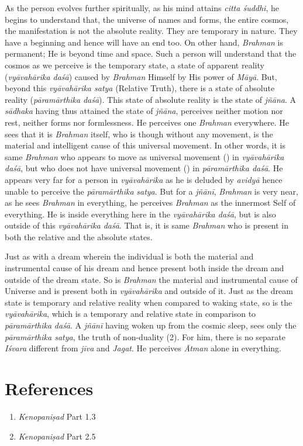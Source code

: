 As the person evolves further spiritually, as his mind attains \emph{citta śuddhi}, he begins to understand that, the universe of names and forms, the entire cosmos, the manifestation is not the absolute reality. They are temporary in nature. They have a beginning and hence will have an end too. On other hand, \emph{Brahman} is permanent; He is beyond time and space. Such a person will understand that the cosmos as we perceive is the temporary state, a state of apparent reality (\emph{vyāvahārika daśā}) caused by \emph{Brahman} Himself by His power of \emph{Māyā}. But, beyond this \emph{vyāvahārika satya} (Relative Truth), there is a state of absolute reality (\emph{pāramārthika} \emph{daśā}). This state of absolute reality is the state of \emph{jñāna}. A \emph{sādhaka} having thus attained the state of \emph{jñāna}, perceives neither motion nor rest, neither forms nor formlessness. He perceives one \emph{Brahman} everywhere. He sees that it is \emph{Brahman} itself, who is though without any movement, is the material and intelligent cause of this universal movement. In other words, it is same \emph{Brahman} who appears to move as universal movement () in \emph{vyāvahārika daśā}, but who does not have universal movement () in \emph{pāramārthika daśā}. He appears very far for a person in \emph{vyāvahārika} as he is deluded by \emph{avidyā} hence unable to perceive the \emph{pāramārthika} \emph{satya}. But for a \emph{jñānī}, \emph{Brahman} is very near, as he sees \emph{Brahman} in everything, he perceives \emph{Brahman} as the innermost Self of everything. He is inside everything here in the \emph{vyāvahārika daśā}, but is also outside of this \emph{vyāvahārika daśā}. That is, it is same \emph{Brahman} who is present in both the relative and the absolute states.

Just as with a dream wherein the individual is both the material and instrumental cause of his dream and hence present both inside the dream and outside of the dream state. So is \emph{Brahman} the material and instrumental cause of Universe and is present both in \emph{vyāvahārika} and outside of it. Just as the dream state is temporary and relative reality when compared to waking state, so is the \emph{vyāvahārika}, which is a temporary and relative state in comparison to \emph{pāramārthika} \emph{daśā}. A \emph{jñānī} having woken up from the cosmic sleep, sees only the \emph{pāramārthika satya}, the truth of non-duality (2). For him, there is no separate \emph{Iśvara} different from \emph{jīva} and \emph{Jagat}. He perceives \emph{Ātman} alone in everything.

\section*{References}

\begin{enumerate}
\itemsep=0pt
\item
  \emph{Kenopaniṣad} Part 1.3
\item
  \emph{Kenopaniṣad} Part 2.5
\end{enumerate}
